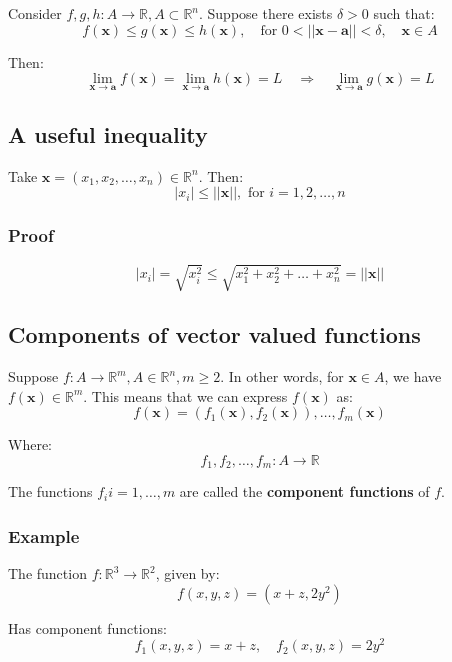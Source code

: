 \documentclass[11pt]{article}
\begin{document}
Consider \(f, g, h : A \rightarrow \mathbb{R}, A \subset \mathbb{R}^n\). Suppose there exists \(\delta > 0\) such that:
\[f(\boldsymbol{x}) \le g(\boldsymbol{x}) \le h(\boldsymbol{x}), \quad \text{for } 0 < ||\boldsymbol{x} - \boldsymbol{a}|| < \delta, \quad \boldsymbol{x} \in A\]

Then:
\[\lim_{\boldsymbol{x} \rightarrow \boldsymbol{a}} f(\boldsymbol{x}) = \lim_{\boldsymbol{x} \rightarrow \boldsymbol{a}} h(\boldsymbol{x}) = L \quad \Rightarrow \quad \lim_{\boldsymbol{x} \rightarrow \boldsymbol{a}} g(\boldsymbol{x}) = L\]

\subsection{A useful inequality}
\label{sec:org224eac9}
Take \(\boldsymbol{x} = (x_1, x_2, \ldots, x_n) \in \mathbb{R}^n\). Then:
\[|x_i| \le ||\boldsymbol{x}||, \text{ for } i = 1, 2, \ldots, n\]

\subsubsection{Proof}
\label{sec:org5e27886}
\[|x_i| = \sqrt{x_i^2} \le \sqrt{x_1^2 + x_2^2 + \ldots + x_n^2} = ||\boldsymbol{x}||\]

\subsection{Components of vector valued functions}
\label{sec:org9e2fa43}
Suppose \(f : A \rightarrow \mathbb{R}^m, A \in \mathbb{R}^n, m \ge 2\). In other words, for \(\boldsymbol{x} \in A\), we have \(f(\boldsymbol{x}) \in \mathbb{R}^m\). This means that we can express \(f(\boldsymbol{x})\) as:
\[f(\boldsymbol{x}) = (f_1(\boldsymbol{x}), f_2(\boldsymbol{x})), \ldots, f_m(\boldsymbol{x})\]

Where:
\[f_1, f_2, \ldots, f_m : A \rightarrow \mathbb{R}\]

The functions \(f_i i = 1, \ldots, m\) are called the \textbf{component functions} of \(f\).

\subsubsection{Example}
\label{sec:org5743431}
The function \(f : \mathbb{R}^3 \rightarrow \mathbb{R}^2\), given by:
\[f(x, y, z) = (x + z, 2y^2)\]

Has component functions:
\[f_1(x, y, z) = x + z, \quad f_2(x, y, z) = 2y^2\]
\end{document}
